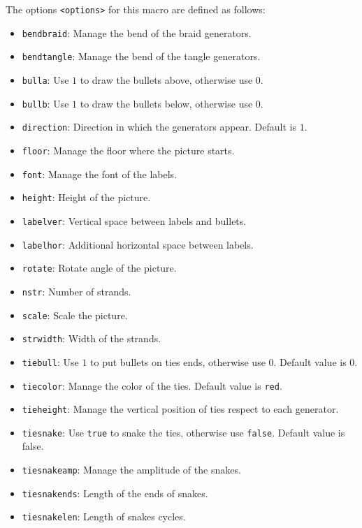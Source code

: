 \documentclass[reqno]{../../../Projects/LaTeX/gtpart}
\numberwithin{equation}{section}
\begin{document}
The options \texttt{<options>} for this macro are defined as follows:
\begin{itemize}
\item \texttt{bendbraid}: Manage the bend of the braid generators.
\item \texttt{bendtangle}: Manage the bend of the tangle generators.
\item \texttt{bulla}: Use $1$ to draw the bullets above, otherwise use $0$.
\item \texttt{bullb}: Use $1$ to draw the bullets below, otherwise use $0$.
\item \texttt{direction}: Direction in which the generators appear. Default is $1$.
\item \texttt{floor}: Manage the floor where the picture starts.
\item \texttt{font}: Manage the font of the labels.
\item \texttt{height}: Height of the picture.
\item \texttt{labelver}: Vertical space between labels and bullets.
\item \texttt{labelhor}: Additional horizontal space between labels.
\item \texttt{rotate}: Rotate angle of the picture.
\item \texttt{nstr}: Number of strands.
\item \texttt{scale}: Scale the picture.
\item \texttt{strwidth}: Width of the strands.
\item \texttt{tiebull}: Use $1$ to put bullets on ties ends, otherwise use $0$. Default value is $0$.
\item \texttt{tiecolor}: Manage the color of the ties. Default value is \texttt{red}.
\item \texttt{tieheight}: Manage the vertical position of ties respect to each generator.
\item \texttt{tiesnake}: Use \texttt{true} to snake the ties, otherwise use \texttt{false}. Default value is false.
\item \texttt{tiesnakeamp}: Manage the amplitude of the snakes.
\item \texttt{tiesnakends}: Length of the ends of snakes.
\item \texttt{tiesnakelen}: Length of snakes cycles.

\end{itemize}
\end{document}
